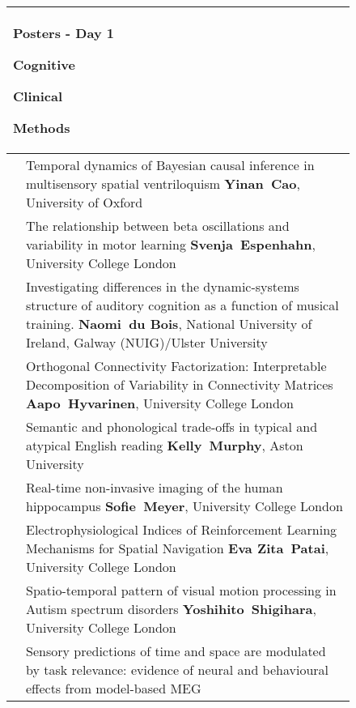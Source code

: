 \begin{figure}[htp]
\centering
\footnotesize
\begin{tabularx}{\textwidth}{lp{.92\linewidth}}
\multicolumn{2}{l}{\Large Posters - Day 1 \hspace{8cm} \colorbox{set1!50}{\small\strut Cognitive}\colorbox{set2!50}{\small\strut Clinical}\colorbox{set3!50}{\small\strut Methods}}\\
\toprule
\cellcolor{set1!50}{\bf A-1} & {\footnotesize Temporal dynamics of Bayesian causal inference in multisensory spatial ventriloquism
} {\bf\footnotesize Yinan~Cao}, {\footnotesize University of Oxford}  \\
\cellcolor{set1!50}{\bf A-2} & {\footnotesize The relationship between beta oscillations and variability in motor learning
} {\bf\footnotesize Svenja~Espenhahn}, {\footnotesize University College London}  \\
\cellcolor{set1!50}{\bf A-3} & {\footnotesize Investigating differences in the dynamic-systems structure of auditory cognition as a function of musical training.
} {\bf\footnotesize Naomi~du Bois}, {\footnotesize National University of Ireland, Galway (NUIG)/Ulster University }  \\
\cellcolor{set3!50}{\bf A-4} & {\footnotesize Orthogonal Connectivity Factorization: Interpretable Decomposition of Variability in Connectivity Matrices
} {\bf\footnotesize Aapo~Hyvarinen}, {\footnotesize University College London}  \\
\cellcolor{set1!50}{\bf A-5} & {\footnotesize Semantic and phonological trade-offs in typical and atypical English reading
} {\bf\footnotesize Kelly~Murphy}, {\footnotesize Aston University}  \\
\cellcolor{set3!50}{\bf A-6} & {\footnotesize Real-time non-invasive imaging of the human hippocampus
} {\bf\footnotesize Sofie~Meyer}, {\footnotesize University College London}  \\
\cellcolor{set1!50}{\bf A-7} & {\footnotesize Electrophysiological Indices of Reinforcement Learning Mechanisms for Spatial Navigation
} {\bf\footnotesize Eva Zita~Patai}, {\footnotesize University College London}  \\
\cellcolor{set2!50}{\bf A-8} & {\footnotesize Spatio-temporal pattern of visual motion processing in Autism spectrum disorders
} {\bf\footnotesize Yoshihito~Shigihara}, {\footnotesize University College London}  \\
\cellcolor{set1!50}{\bf A-9} & {\footnotesize Sensory predictions of time and space are modulated by task relevance: evidence of neural and behavioural effects from model-based MEG
}
\end{tabularx}
\end{figure}
